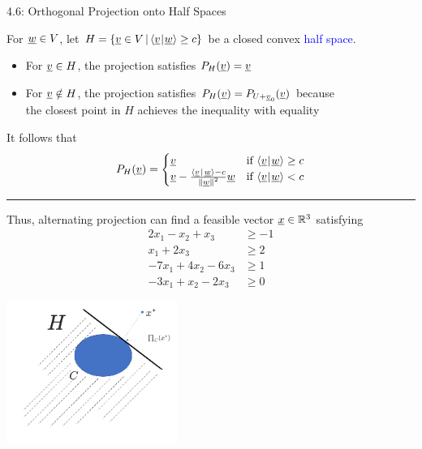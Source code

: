 \documentclass[10pt,english,aspectratio=169]{beamer}
\begin{document}
\begin{frame}{4.6: Orthogonal Projection onto Half Spaces}

\vspace{2mm}

For $\underline{w} \in V$, let $H = \{ \underline{v} \in V \,|\, {\langle \underline v \mskip1mu | \mskip1mu \underline w \rangle}\geq c \}$ be a closed convex \textcolor{blue}{half space}.

\begin{itemize}
\item For $\underline v\in H$, the projection satisfies $P_{H}(\underline v)=\underline v$ 
\item For $\underline v\notin H$, the projection satisfies $P_{H}(\underline v)=P_{U+\underline v_{0}}(\underline v)$ because \\ the closest point in $H$ achieves the inequality with equality
\end{itemize}

\vspace{2mm}

It follows that \vspace{-2.5mm}
\begin{equation*}
P_{H}(\underline v)=\begin{cases}
\underline v & \text{if }{\langle \underline v \mskip1mu | \mskip1mu \underline w \rangle}\geq c\\
\underline v-\frac{{\left\langle  \underline v \mskip2mu \middle| \mskip2mu \underline w \right\rangle} -c}{\left\Vert \underline w\right\Vert ^{2}}\underline w & \text{if }{\langle \underline v \mskip1mu | \mskip1mu \underline w \rangle}<c
\end{cases}\label{eq:proj_ineq}
\end{equation*}

\vspace{1mm}
\hrule
\vspace{4mm}
Thus, alternating projection can find a feasible vector $\underline{x}\in \mathbb{R}^3$ satisfying \vspace{-1mm}
{\small
\begin{align*}
2x_{1}-x_{2}+x_{3} & \geq-1\\
x_{1}+2x_{3} & \geq2\\
-7x_{1}+4x_{2}-6x_{3} & \geq1\\
-3x_{1}+x_{2}-2x_{3} & \geq0
\end{align*}
}
\vspace{-3mm}

\vspace{-1.1in}
\hspace*{3.7in}
\includegraphics[width=2.2in]{figures/ch4_halfspace}

\end{frame}
\end{document}
